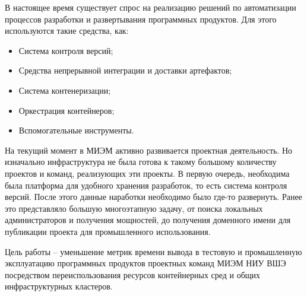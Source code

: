 \Introduction

В настоящее время существует спрос на реализацию решений по автоматизации процессов разработки и развертывания программных продуктов. Для этого используются такие средства, как:

\begin{itemize}
    \item Система контроля версий;
    \item Средства непрерывной интеграции и доставки артефактов;
    \item Система контенеризации;
    \item Оркестрация контейнеров;
    \item Вспомогательные инструменты.
\end{itemize}

На текущий момент в МИЭМ активно развивается проектная деятельность. Но изначально инфраструктура не была готова к такому большому количеству проектов и команд, реализующих эти проекты. В первую очередь, необходима была платформа для удобного хранения разработок, то есть система контроля версий. После этого данные наработки необходимо было где-то развернуть. Ранее это представляло большую многоэтапную задачу, от поиска локальных администраторов и получения мощностей, до получения доменного имени для публикации проекта для промышленного использования.

Цель работы -- уменьшение метрик времени вывода в тестовую и промышленную эксплуатацию программных продуктов проектных команд МИЭМ НИУ ВШЭ посредством переиспользования ресурсов контейнерных сред и общих инфраструктурных кластеров.
